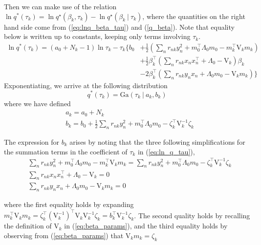 \documentclass[twoside,11pt]{article}
\newcommand\given[1][]{\:#1\vert\:}
\newcommand{\transpose}[1]{#1^{\intercal}}
\begin{document}
Then we can make use of the relation $\ln q^{*}(\tau_k) = \ln q^{\star}(\beta_k, \tau_k) -  \ln q^{\star}(\beta_k \given \tau_k)$, where the quantities on the right hand side come from (\ref{eq:lnq_beta_tau}) and (\ref{q_beta}). Note that equality below is written up to constants, keeping only terms involving $\tau_k$. 
\begin{equation}\label{eq:ln_q_tau}
\begin{split}
	 \ln q^{*}(\tau_k) = (a_0 + N_k - 1) \ln \tau_k - \tau_k \Bigg\{ b_0 & + \frac{1}{2} \left( \sum_{n}r_{nk}y_n^2 + \transpose{m_0} \Lambda_0 m_0 - \transpose{m_k} \mathrm{V}_k m_k \right) \\
	 & + \frac{1}{2} \transpose{\beta_k} \left( \sum_{n} r_{nk} x_n \transpose{x_n} + \Lambda_0 - \mathrm{V}_k \right) \beta_k \\
	 & - 2 \transpose{\beta_k} \left( \sum_{n} r_{nk} y_n x_n + \Lambda_0 m_0 - \mathrm{V}_k m_k \right) \Bigg\}
\end{split}
\end{equation}
Exponentiating, we arrive at the following distribution
\begin{equation} \label{eq:q_tau}
	q^{*}(\tau_k) =  \mathrm{Ga}\left( \tau_k \given a_k, b_k \right)
\end{equation}
where we have defined
\begin{equation} \label{eq:tau_params}
\begin{split}
	& a_k = a_0 + N_k \\
	& b_k = b_0 + \frac{1}{2} \sum_{n} r_{nk} y_n^2 + \transpose{m_0} \Lambda_0 m_0 - \transpose{\zeta_k} \mathrm{V}_k^{-1} \zeta_k
\end{split}
\end{equation}

The expression for $b_k$ arises by noting that the three following simplifications for the summation terms in the coefficient of $\tau_k$ in (\ref{eq:ln_q_tau}), 
\begin{align*}
	& \sum_{n}r_{nk}y_n^2 + \transpose{m_0} \Lambda_0 m_0 - \transpose{m_k} \mathrm{V}_k m_k =  \sum_{n}r_{nk}y_n^2 + \transpose{m_0} \Lambda_0 m_0 -\transpose{\zeta_k} \mathrm{V}_k^{-1} \zeta_k \\
	& \sum_{n} r_{nk} x_n \transpose{x_n} + \Lambda_0 - \mathrm{V}_k = 0 \\
	& \sum_{n} r_{nk} y_n x_n + \Lambda_0 m_0 - \mathrm{V}_k m_k = 0
\end{align*}

where the first equality holds by expanding $\transpose{m_k} \mathrm{V}_k m_k = \transpose{\zeta_k} \left( \mathrm{V}_k^{-1}\right)^{\intercal} \mathrm{V}_k \mathrm{V}_k^{-1} \zeta_k = \transpose{b_k} \mathrm{V}_k^{-1} \zeta_k$. The second quality holds by recalling the definition of $\mathrm{V}_k$ in (\ref{eq:beta_params}), and the third equality holds by observing from (\ref{eq:beta_params}) that $\mathrm{V}_{k} m_k = \zeta_k$
\end{document}

